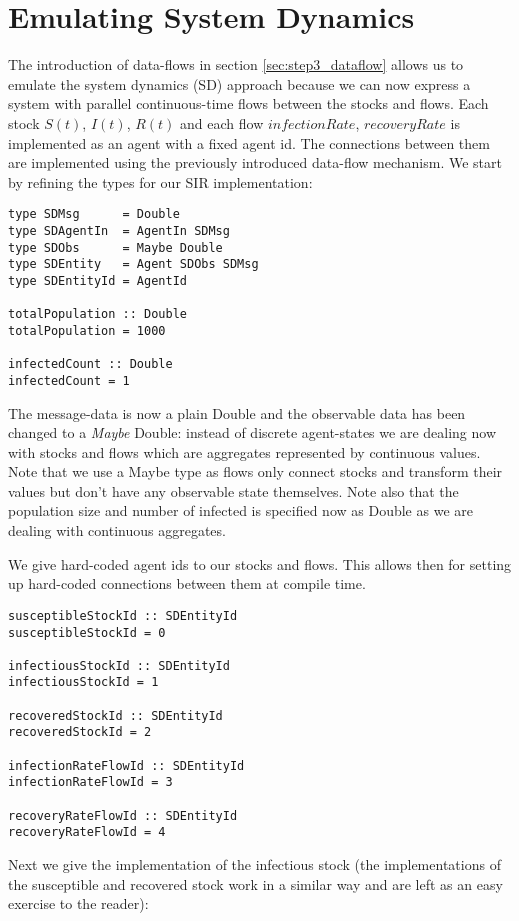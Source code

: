 \section{Emulating System Dynamics}
The introduction of data-flows in section \ref{sec:step3_dataflow} allows us to emulate the system dynamics (SD) approach because we can now express a system with parallel continuous-time flows between the stocks and flows. Each stock $S(t)$, $I(t)$, $R(t)$ and each flow $infectionRate$, $recoveryRate$ is implemented as an agent with a fixed agent id. The connections between them are implemented using the previously introduced data-flow mechanism. We start by refining the types for our SIR implementation:

\begin{verbatim}
type SDMsg      = Double
type SDAgentIn  = AgentIn SDMsg
type SDObs      = Maybe Double
type SDEntity   = Agent SDObs SDMsg
type SDEntityId = AgentId

totalPopulation :: Double
totalPopulation = 1000

infectedCount :: Double
infectedCount = 1
\end{verbatim}

The message-data is now a plain Double and the observable data has been changed to a \textit{Maybe} Double: instead of discrete agent-states we are dealing now with stocks and flows which are aggregates represented by continuous values. Note that we use a Maybe type as flows only connect stocks and transform their values but don't have any observable state themselves. Note also that the population size and number of infected is specified now as Double as we are dealing with continuous aggregates.

We give hard-coded agent ids to our stocks and flows. This allows then for setting up hard-coded connections between them at compile time.
\begin{verbatim}
susceptibleStockId :: SDEntityId
susceptibleStockId = 0

infectiousStockId :: SDEntityId
infectiousStockId = 1

recoveredStockId :: SDEntityId
recoveredStockId = 2

infectionRateFlowId :: SDEntityId
infectionRateFlowId = 3

recoveryRateFlowId :: SDEntityId
recoveryRateFlowId = 4
\end{verbatim}

Next we give the implementation of the infectious stock (the implementations of the susceptible and recovered stock work in a similar way and are left as an easy exercise to the reader):

